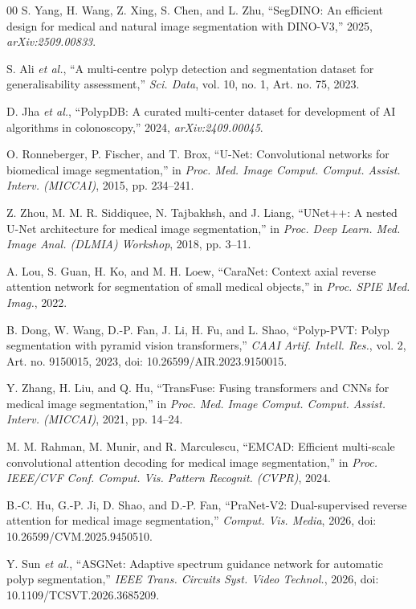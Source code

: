 \documentclass{ieeeaccess}
\begin{document}
\begin{thebibliography}{00}
 S. Yang, H. Wang, Z. Xing, S. Chen, and L. Zhu, ``SegDINO: An efficient design for medical and natural image segmentation with DINO-V3,'' 2025, \emph{arXiv:2509.00833}.


 S. Ali \emph{et al.}, ``A multi-centre polyp detection and segmentation dataset for generalisability assessment,'' \emph{Sci. Data}, vol. 10, no. 1, Art. no. 75, 2023.


 D. Jha \emph{et al.}, ``PolypDB: A curated multi-center dataset for development of AI algorithms in colonoscopy,'' 2024, \emph{arXiv:2409.00045}.


 O. Ronneberger, P. Fischer, and T. Brox, ``U-Net: Convolutional networks for biomedical image segmentation,'' in \emph{Proc. Med. Image Comput. Comput. Assist. Interv. (MICCAI)}, 2015, pp. 234--241.


 Z. Zhou, M. M. R. Siddiquee, N. Tajbakhsh, and J. Liang, ``UNet++: A nested U-Net architecture for medical image segmentation,'' in \emph{Proc. Deep Learn. Med. Image Anal. (DLMIA) Workshop}, 2018, pp. 3--11.


 A. Lou, S. Guan, H. Ko, and M. H. Loew, ``CaraNet: Context axial reverse attention network for segmentation of small medical objects,'' in \emph{Proc. SPIE Med. Imag.}, 2022.


 B. Dong, W. Wang, D.-P. Fan, J. Li, H. Fu, and L. Shao, ``Polyp-PVT: Polyp segmentation with pyramid vision transformers,'' \emph{CAAI Artif. Intell. Res.}, vol. 2, Art. no. 9150015, 2023, doi: 10.26599/AIR.2023.9150015.


 Y. Zhang, H. Liu, and Q. Hu, ``TransFuse: Fusing transformers and CNNs for medical image segmentation,'' in \emph{Proc. Med. Image Comput. Comput. Assist. Interv. (MICCAI)}, 2021, pp. 14--24.


 M. M. Rahman, M. Munir, and R. Marculescu, ``EMCAD: Efficient multi-scale convolutional attention decoding for medical image segmentation,'' in \emph{Proc. IEEE/CVF Conf. Comput. Vis. Pattern Recognit. (CVPR)}, 2024.


 B.-C. Hu, G.-P. Ji, D. Shao, and D.-P. Fan, ``PraNet-V2: Dual-supervised reverse attention for medical image segmentation,'' \emph{Comput. Vis. Media}, 2026, doi: 10.26599/CVM.2025.9450510.


 Y. Sun \emph{et al.}, ``ASGNet: Adaptive spectrum guidance network for automatic polyp segmentation,'' \emph{IEEE Trans. Circuits Syst. Video Technol.}, 2026, doi: 10.1109/TCSVT.2026.3685209.



\end{thebibliography}
\end{document}
